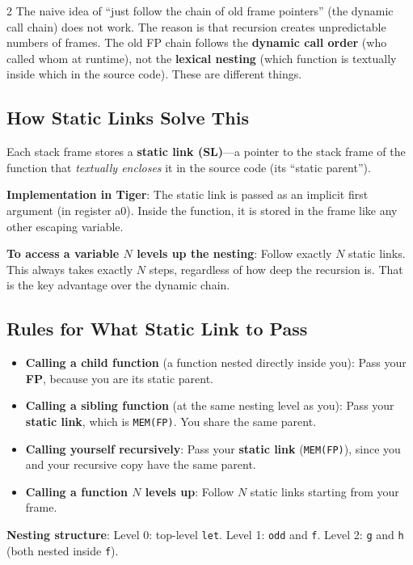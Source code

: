 \documentclass[9pt,landscape]{extarticle}
\begin{document}
\begin{multicols}{2}
The naive idea of ``just follow the chain of old frame pointers'' (the dynamic call chain) does not work. The reason is that recursion creates unpredictable numbers of frames. The old FP chain follows the \textbf{dynamic call order} (who called whom at runtime), not the \textbf{lexical nesting} (which function is textually inside which in the source code). These are different things.

\subsection{How Static Links Solve This}

Each stack frame stores a \textbf{static link (SL)}---a pointer to the stack frame of the function that \emph{textually encloses} it in the source code (its ``static parent'').

\textbf{Implementation in Tiger}: The static link is passed as an implicit first argument (in register a0). Inside the function, it is stored in the frame like any other escaping variable.

\textbf{To access a variable $N$ levels up the nesting}: Follow exactly $N$ static links. This always takes exactly $N$ steps, regardless of how deep the recursion is. That is the key advantage over the dynamic chain.

\subsection{Rules for What Static Link to Pass}

\begin{itemize}
  \item \textbf{Calling a child function} (a function nested directly inside you): Pass your \textbf{FP}, because you are its static parent.
  \item \textbf{Calling a sibling function} (at the same nesting level as you): Pass your \textbf{static link}, which is \texttt{MEM(FP)}. You share the same parent.
  \item \textbf{Calling yourself recursively}: Pass your \textbf{static link} (\texttt{MEM(FP)}), since you and your recursive copy have the same parent.
  \item \textbf{Calling a function $N$ levels up}: Follow $N$ static links starting from your frame.
\end{itemize}

\begin{exambox}
\textbf{Nesting structure}: Level 0: top-level \texttt{let}. Level 1: \texttt{odd} and \texttt{f}. Level 2: \texttt{g} and \texttt{h} (both nested inside \texttt{f}).


\end{exambox}
\end{multicols}
\end{document}
